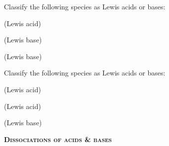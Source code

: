 \documentclass[main.tex]{subfiles}
\begin{document}
\begin{multicols*}{2}
\begin{question}[ID=\the\value{numA}]
Classify the following species as Lewis acids or bases:
\begin{inparaenum}[(a)]
\item {} %
\item {} %
\item {} %
 \end{inparaenum}
\end{question}
\begin{solution}
\begin{inparaenum}[(a)]
\item {}   (Lewis acid)
\item {}   (Lewis base)
\item {}   (Lewis base)
\end{inparaenum}
\hspace{0.1cm}\end{solution}%

\begin{question}[ID=\the\value{numA}]
Classify the following species as Lewis acids or bases:
\begin{inparaenum}[(a)]
\item {} %
\item {} %
\item {} %
 \end{inparaenum}
\end{question}
\begin{solution}
\begin{inparaenum}[(a)]
\item {}   (Lewis acid)
\item {}   (Lewis acid)
\item {}   (Lewis base)
\end{inparaenum}
\hspace{0.1cm}\end{solution}%


{\raggedright\textsc{\textbf{Dissociations of acids \& bases}}\par}


\end{multicols*}
\end{document}
